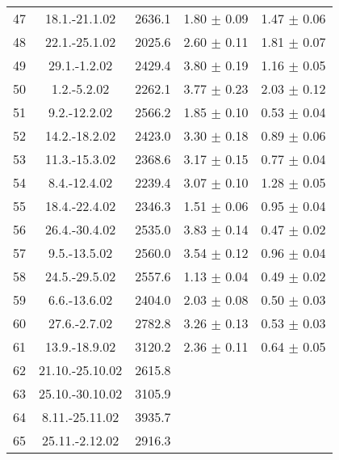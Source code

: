 \documentclass[a4paper,12pt]{article}
\begin{document}
\begin{center}
\begin{longtable}{|c|c|c|c|c|}
    47  &       18.1.-21.1.02   &       2636.1  &       1.80 $\pm$ 0.09 &       1.47 $\pm$ 0.06 \\
    48  &       22.1.-25.1.02   &       2025.6  &       2.60 $\pm$ 0.11 &       1.81 $\pm$ 0.07 \\
    49  &       29.1.-1.2.02    &       2429.4  &       3.80 $\pm$ 0.19 &       1.16 $\pm$ 0.05 \\
    50  &       1.2.-5.2.02     &       2262.1  &       3.77 $\pm$ 0.23 &       2.03 $\pm$ 0.12 \\
    51  &       9.2.-12.2.02    &       2566.2  &       1.85 $\pm$ 0.10 &       0.53 $\pm$ 0.04 \\
    52  &       14.2.-18.2.02   &       2423.0  &       3.30 $\pm$ 0.18 &       0.89 $\pm$ 0.06 \\
    53  &       11.3.-15.3.02   &       2368.6  &       3.17 $\pm$ 0.15 &       0.77 $\pm$ 0.04 \\
    54  &       8.4.-12.4.02    &       2239.4  &       3.07 $\pm$ 0.10 &       1.28 $\pm$ 0.05 \\
    55  &       18.4.-22.4.02   &       2346.3  &       1.51 $\pm$ 0.06 &       0.95 $\pm$ 0.04 \\
    56  &       26.4.-30.4.02   &       2535.0  &       3.83 $\pm$ 0.14 &       0.47 $\pm$ 0.02 \\
    57  &       9.5.-13.5.02    &       2560.0  &       3.54 $\pm$ 0.12 &       0.96 $\pm$ 0.04 \\
    58  &       24.5.-29.5.02   &       2557.6  &       1.13 $\pm$ 0.04 &       0.49 $\pm$ 0.02 \\
    59  &       6.6.-13.6.02    &       2404.0  &       2.03 $\pm$ 0.08 &       0.50 $\pm$ 0.03 \\
    60  &       27.6.-2.7.02    &       2782.8  &       3.26 $\pm$ 0.13 &       0.53 $\pm$ 0.03 \\
    61  &       13.9.-18.9.02   &       3120.2  &       2.36 $\pm$ 0.11 &       0.64 $\pm$ 0.05 \\
    62  &       21.10.-25.10.02 &       2615.8  &                       &                       \\
    63  &       25.10.-30.10.02 &       3105.9  &                       &                       \\
    64  &       8.11.-25.11.02  &       3935.7  &                       &                       \\
    65  &       25.11.-2.12.02  &       2916.3  &                       &                       \\

\end{longtable}
\end{center}
\end{document}

